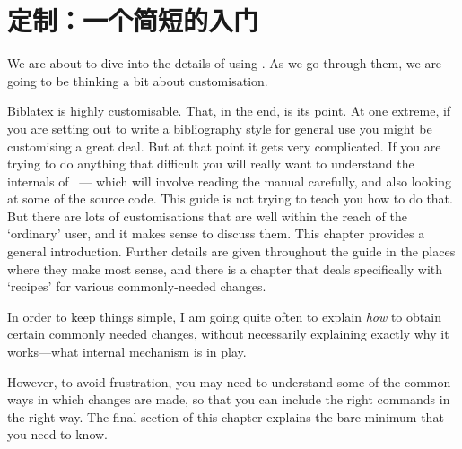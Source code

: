 \chapter{定制：一个简短的入门}\label{ch:customize1}

We are about to dive into the details of using \biblatex. 
As we go
through them, we are going to be thinking a bit about
customisation.

\textsf{Biblatex} is highly customisable. That, in the end, is its
point. At one extreme, if you are setting out to write a bibliography
style for general use you might be customising a great deal. But at
that point it gets very complicated. If you are trying to do anything
that difficult you will really want to understand the internals of
\biblatex\ --- which will involve reading the manual
carefully, and also looking at some of the
source code. This guide is not trying to teach you how to do that. But
there are lots of customisations that are well within the reach of the
`ordinary' user, and it makes sense to discuss them. This chapter
provides a general introduction. Further details are given throughout
the guide in the places where they make most sense, and there is a
chapter that deals specifically with
`recipes' for various commonly-needed changes.

In order to keep things simple, I am going quite often to explain
\emph{how} to obtain certain commonly needed changes, without
necessarily explaining exactly why it works---what internal mechanism
is in play.

However, to avoid frustration, you may need to understand some of the
common ways in which changes are made, so that you can include the
right commands in the right way. The final section of this chapter
explains the bare minimum that you need to know.

